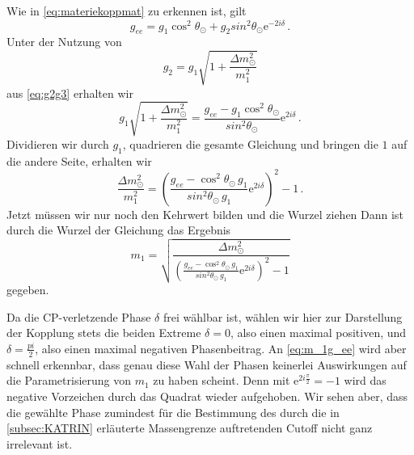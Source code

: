Wie in \eqref{eq:materiekoppmat} zu erkennen ist, gilt
\begin{equation}
    g_{ee} = g_1 \cos^2 \theta_\odot + g_2 sin^2 \theta_\odot \mathrm{e}^{-2 i \delta} \,.
    \label{eq:g_ee}
\end{equation}
Unter der Nutzung von
\begin{equation*}
    g_2 = g_1 \sqrt{1 + \frac{\Delta m^2_\odot}{m^2_1}}
\end{equation*}
aus \eqref{eq:g2g3} erhalten wir
\begin{equation*}
    g_1 \sqrt{1 + \frac{\Delta m^2_\odot}{m^2_1}} = \frac{g_{ee} - g_1 \cos^2 \theta_\odot}{sin^2 \theta_\odot} \mathrm{e}^{2 i \delta} \,.
\end{equation*}
Dividieren wir durch $g_1$, quadrieren die gesamte Gleichung und bringen die $1$ auf die andere Seite, erhalten wir
\begin{equation*}
    \frac{\Delta m^2_\odot}{m^2_1} = \left(\frac{g_{ee} -  \cos^2 \theta_\odot \, g_1}{sin^2 \theta_\odot \, g_1} \mathrm{e}^{2 i \delta} \right)^2 - 1 \,.
\end{equation*}
Jetzt müssen wir nur noch den Kehrwert bilden und die Wurzel ziehen
Dann ist durch die Wurzel der Gleichung das Ergebnis
\begin{equation}
    m_1 = \sqrt{\frac{\Delta m^2_\odot}{\left(\frac{g_{ee} -  \cos^2 \theta_\odot \, g_1}{sin^2 \theta_\odot \, g_1} \mathrm{e}^{2 i \delta} \right)^2 - 1}}
    \label{eq:m_1g_ee}
\end{equation}
gegeben.

Da die CP-verletzende Phase $\delta$ frei wählbar ist, wählen wir hier zur Darstellung der Kopplung stets die beiden Extreme $\delta = 0$, also einen maximal positiven, und $\delta = \frac{pi}{2}$, also einen maximal negativen Phasenbeitrag.
An \eqref{eq:m_1g_ee} wird aber schnell erkennbar, dass genau diese Wahl der Phasen keinerlei Auswirkungen auf die Parametrisierung von $m_1$ zu haben scheint.
Denn mit $\mathrm{e}^{2 i \frac{\pi}{2}} = -1$ wird das negative Vorzeichen durch das Quadrat wieder aufgehoben.
Wir sehen aber, dass die gewählte Phase zumindest für die Bestimmung des durch die in \autoref{subsec:KATRIN} erläuterte Massengrenze auftretenden Cutoff nicht ganz irrelevant ist.

